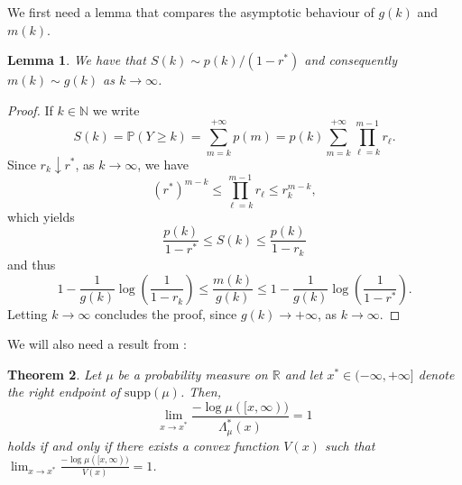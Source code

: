 \documentclass[11pt,a4paper]{article} %
\newtheorem{theorem}{Theorem}[section]
\newtheorem{lemma}[theorem]{Lemma}
\theoremstyle{definition}
\theoremstyle{remark}
\newcommand{\1}{\mathds{1}}
\begin{document}
We first need a lemma that compares the asymptotic behaviour of $g(k)$ and $m(k)$.

\begin{lemma}\label{lem:m-asymptotics}
We have that $S(k) \sim p(k)/(1-r^\ast)$ and consequently $m(k) \sim g(k)$ as $k \to \infty$.    
\end{lemma}

\begin{proof}
If $k \in \mathbb{N}$ we write $$S(k)=\mathbb{P}(Y \geq k)=\sum_{m=k}^{+\infty}p(m)=p(k) \sum_{m=k}^{+\infty} \prod_{\ell=k}^{m-1}r_\ell.$$
Since $r_k \downarrow r^\ast$, as $k \to \infty$, we have $$(r^\ast)^{m-k} \leq \prod_{\ell=k}^{m-1}r_\ell \leq r_k^{m-k},$$ which yields $$\frac{p(k)}{1-r^\ast} \leq S(k) \leq \frac{p(k)}{1-r_k}$$ and thus $$1-\frac{1}{g(k)} \log\left(\frac{1}{1-r_k}\right) \leq \frac{m(k)}{g(k)} \leq 1-\frac{1}{g(k)} \log\left(\frac{1}{1-r^\ast}\right).$$ Letting $k \to \infty$ concludes the proof, since $g(k) \to +\infty$, as $k \to \infty$.
\end{proof}


We will also need a result from \cite{BC}: 
\begin{theorem}\label{thm:L*-cond-char}
Let $\mu$ be a probability measure on $\mathbb{R}$ and let $x^\ast\in(-\infty,+\infty]$ denote the right endpoint of $\mathrm{supp}(\mu)$. Then, 
\[
\lim_{x\to x^\ast} \frac{-\log\mu([x,\infty))}{\Lambda_\mu^\ast(x)}=1
\]
holds if and only if there exists a convex function $V(x)$ such that $\lim_{x\to x^\ast}\frac{-\log\mu([x,\infty))}{V(x)}=1$.
\end{theorem}
\end{document}
